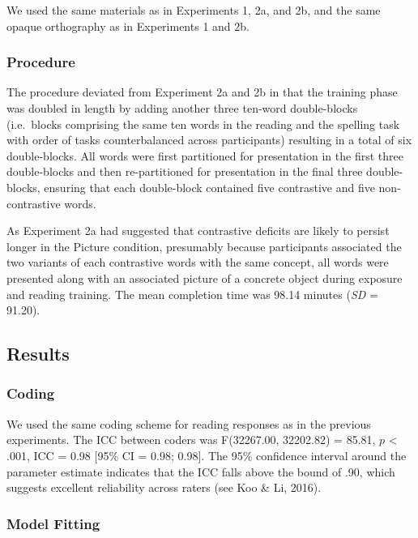 \documentclass[doc,floatsintext]{apa6}
\begin{document}
We used the same materials as in Experiments 1, 2a, and 2b, and the same
opaque orthography as in Experiments 1 and 2b.

\subsubsection{Procedure}\label{procedure-3}

The procedure deviated from Experiment 2a and 2b in that the training
phase was doubled in length by adding another three ten-word
double-blocks (i.e.~blocks comprising the same ten words in the reading
and the spelling task with order of tasks counterbalanced across
participants) resulting in a total of six double-blocks. All words were
first partitioned for presentation in the first three double-blocks and
then re-partitioned for presentation in the final three double-blocks,
ensuring that each double-block contained five contrastive and five
non-contrastive words.

As Experiment 2a had suggested that contrastive deficits are likely to
persist longer in the Picture condition, presumably because participants
associated the two variants of each contrastive words with the same
concept, all words were presented along with an associated picture of a
concrete object during exposure and reading training. The mean
completion time was 98.14 minutes (\emph{SD} = 91.20).

\subsection{Results}\label{results-3}

\subsubsection{Coding}\label{coding-3}

We used the same coding scheme for reading responses as in the previous
experiments. The ICC between coders was F(32267.00, 32202.82) = 85.81,
\(p\) \textless{} .001, ICC = 0.98 {[}95\% CI = 0.98; 0.98{]}. The 95\%
confidence interval around the parameter estimate indicates that the ICC
falls above the bound of .90, which suggests excellent reliability
across raters (see Koo \& Li, 2016).

\subsubsection{Model Fitting}\label{model-fitting-3}
\end{document}
